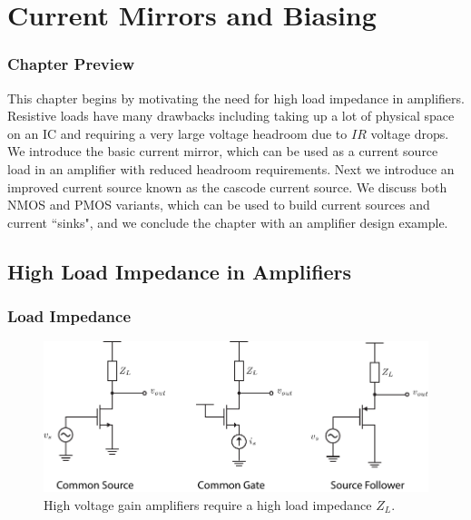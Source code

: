 


\chapter{Current Mirrors and Biasing}


\graphicspath{{./figs_current_source/}}



\subsection{Chapter Preview}

This chapter begins by motivating the need for high load impedance in amplifiers.  Resistive loads have many drawbacks including taking up a lot of physical space on an IC and requiring a very large voltage headroom due to $IR$ voltage drops.  We introduce the basic current mirror, which can be used as a current source load in an amplifier with reduced headroom requirements.  Next we introduce an improved current source known as the cascode current source.  We discuss both NMOS and PMOS variants, which can be used to build current sources and current ``sinks", and we conclude the chapter with an amplifier design example.
 

\section{High Load Impedance in Amplifiers}




\subsection{Load Impedance}

\begin{figure}[tb]
\begin{center}
\includegraphics[width=1\columnwidth]{0highZload.pdf}
\end{center}
\caption{High voltage gain amplifiers require a high load impedance $Z_L$.} \label{fig:0highZload.pdf}
\end{figure}

